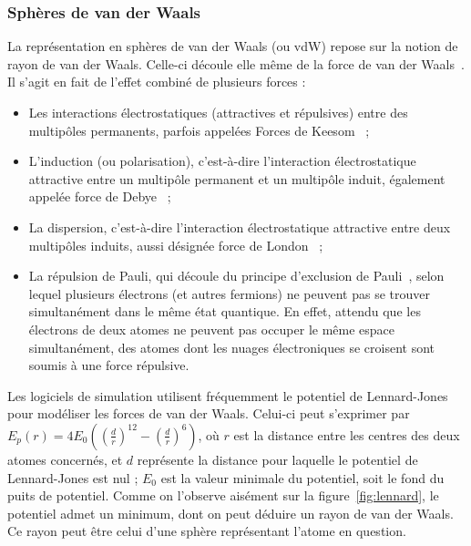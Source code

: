 	\subsubsection{Sphères de van der Waals} La représentation en sphères de van der Waals (ou vdW) repose sur la notion de rayon de van der Waals. Celle-ci découle elle même de la force de van der Waals~\cite{dzyaloshinskii1961general}. Il s'agit en fait de l'effet combiné de plusieurs forces :
	
	\begin{itemize}
	    \item Les interactions électrostatiques (attractives et répulsives) entre des multipôles permanents, parfois appelées Forces de Keesom~\cite{keesom1915second} ;
		\item L'induction (ou polarisation), c'est-à-dire l'interaction électrostatique attractive entre un multipôle permanent et un multipôle induit, également appelée force de Debye~\cite{debye1913reprinted, debye1929polar} ;
	    \item La dispersion, c'est-à-dire l'interaction électrostatique attractive entre deux multipôles induits, aussi désignée force de London~\cite{eisenschitz1930verhaltnis, london1930theorie, london1937general} ;
		\item La répulsion de Pauli, qui découle du principe d'exclusion de Pauli~\cite{pauli1925zusammenhang}, selon lequel plusieurs électrons (et autres fermions) ne peuvent pas se trouver simultanément dans le même état quantique. En effet, attendu que les électrons de deux atomes ne peuvent pas occuper le même espace simultanément, des atomes dont les nuages électroniques se croisent sont soumis à une force répulsive.
	\end{itemize}
	
	Les logiciels de simulation utilisent fréquemment le potentiel de Lennard-Jones~\cite{lennard1924determination} pour modéliser les forces de van der Waals. Celui-ci peut s'exprimer par $E_{p}\left(r\right) = 4E_{0} \left( \left(\frac{d}{r}\right)^{12} - \left(\frac{d}{r}\right)^{6} \right)$, où $r$ est la distance entre les centres des deux atomes concernés, et $d$ représente la distance pour laquelle le potentiel de Lennard-Jones est nul ; $E_{0}$ est la valeur minimale du potentiel, soit le \og fond \fg{} du puits de potentiel. Comme on l'observe aisément sur la figure~\ref{fig:lennard}, le potentiel admet un minimum, dont on peut déduire un rayon de van der Waals. Ce rayon peut être celui d'une sphère représentant l'atome en question.
 

